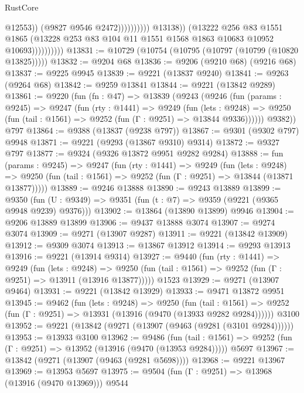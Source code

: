 \begin{lexlean}{RustCore}
\begin{coremodule}
                                              @12553))
                                          (@9827 @9546 @2472))))))))))
                        @13138))
                    (@13222
                      @256
                      @83
                      @1551
                      @1865
                      (@13228 @253 @83 @104 @11 @1551 @1568 @1863 @10683 @10952 @10693))))))))))
@13831 := @10729 (@10754 (@10795 (@10797 (@10799 (@10820 @13825)))))
@13832 := @9204 @68
@13836 := @9206 (@9210 @68) (@9216 @68)
@13837 := @9225 @9945
@13839 := @9221 (@13837 @9240)
@13841 := @9263 (@9264 @68)
@13842 := @9259 @13841
@13844 := @9221 (@13842 @9289)
@13861 := @9220
    (fun (fn : @47) =>
    @13839
      (@9243
        (@9246
          (fun (params : @9245) =>
          @9247
            (fun (rty : @1441) =>
            @9249
              (fun (lets : @9248) =>
              @9250 (fun (tail : @1561) => @9252 (fun (Γ : @9251) => @13844 @9336))))))
        @9382))
    @797
@13864 := @9388 (@13837 (@9238 @797))
@13867 := @9301 (@9302 @797) @9948
@13871 := @9221 (@9293 (@13867 @9310) @9314)
@13872 := @9327 @797
@13877 := @9324 (@9326 @13872 @9951 @9282 @9284)
@13888 := fun (params : @9245) =>
  @9247
    (fun (rty : @1441) =>
    @9249
      (fun (lets : @9248) =>
      @9250 (fun (tail : @1561) => @9252 (fun (Γ : @9251) => @13844 (@13871 @13877)))))
@13889 := @9246 @13888
@13890 := @9243 @13889
@13899 := @9350 (fun (U : @9349) => @9351 (fun (t : @7) => @9359 (@9221 (@9365 @9948 @9239) @9376)))
@13902 := @13864 (@13890 @13899) @9946
@13904 := @9206 @13889 @13899
@13906 := @9437 @13888 @3074
@13907 := @9274 @3074
@13909 := @9271 (@13907 @9287)
@13911 := @9221 (@13842 @13909)
@13912 := @9309 @3074
@13913 := @13867 @13912
@13914 := @9293 @13913
@13916 := @9221 (@13914 @9314)
@13927 := @9440
    (fun (rty : @1441) =>
    @9249
      (fun (lets : @9248) =>
      @9250 (fun (tail : @1561) => @9252 (fun (Γ : @9251) => @13911 (@13916 @13877)))))
    @1523
@13929 := @9271 (@13907 @9464)
@13931 := @9221 (@13842 @13929)
@13933 := @9471 @13872 @9951
@13945 := @9462
    (fun (lets : @9248) =>
    @9250
      (fun (tail : @1561) =>
      @9252 (fun (Γ : @9251) => @13931 (@13916 (@9470 (@13933 @9282 @9284))))))
    @3100
@13952 := @9221 (@13842 (@9271 (@13907 (@9463 (@9281 (@3101 @9284))))))
@13953 := @13933 @3100
@13962 := @9486
    (fun (tail : @1561) => @9252 (fun (Γ : @9251) => @13952 (@13916 (@9470 (@13953 @9284)))))
    @5697
@13967 := @13842 (@9271 (@13907 (@9463 (@9281 @5698))))
@13968 := @9221 @13967
@13969 := @13953 @5697
@13975 := @9504 (fun (Γ : @9251) => @13968 (@13916 (@9470 @13969))) @9544

\end{coremodule}
\end{lexlean}
